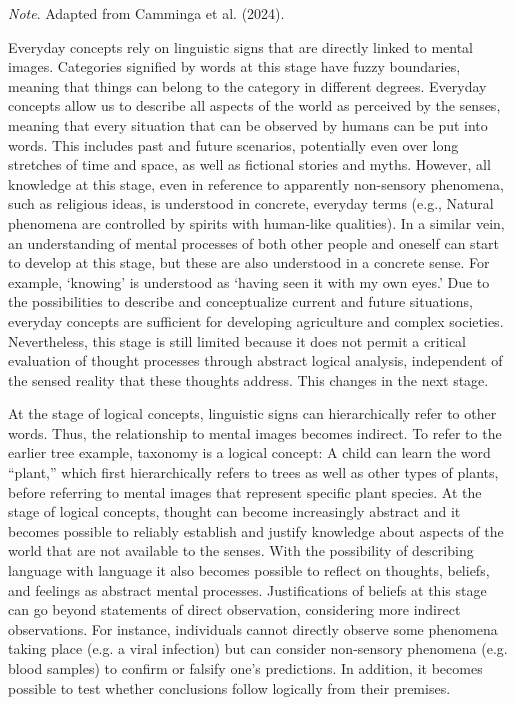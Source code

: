 \documentclass[authordate, empirical]{jote-new-article}
\begin{document}
	\emph{Note}. Adapted from Camminga et al. (2024).







	Everyday concepts rely on linguistic signs that are directly linked to mental images. Categories signified by words at this stage have fuzzy boundaries, meaning that things can belong to the category in different degrees. Everyday concepts allow us to describe all aspects of the world as perceived by the senses, meaning that every situation that can be observed by humans can be put into words. This includes past and future scenarios, potentially even over long stretches of time and space, as well as fictional stories and myths. However, all knowledge at this stage, even in reference to apparently non-sensory phenomena, such as religious ideas, is understood in concrete, everyday terms (e.g., Natural phenomena are controlled by spirits with human-like qualities). In a similar vein, an understanding of mental processes of both other people and oneself can start to develop at this stage, but these are also understood in a concrete sense. For example, ‘knowing' is understood as ‘having seen it with my own eyes.' Due to the possibilities to describe and conceptualize current and future situations, everyday concepts are sufficient for developing agriculture and complex societies. Nevertheless, this stage is still limited because it does not permit a critical evaluation of thought processes through abstract logical analysis, independent of the sensed reality that these thoughts address. This changes in the next stage.



	At the stage of logical concepts, linguistic signs can hierarchically refer to other words. Thus, the relationship to mental images becomes indirect. To refer to the earlier tree example, taxonomy is a logical concept: A child can learn the word “plant,” which first hierarchically refers to trees as well as other types of plants, before referring to mental images that represent specific plant species. At the stage of logical concepts, thought can become increasingly abstract and it becomes possible to reliably establish and justify knowledge about aspects of the world that are not available to the senses. With the possibility of describing language with language it also becomes possible to reflect on thoughts, beliefs, and feelings as abstract mental processes. Justifications of beliefs at this stage can go beyond statements of direct observation, considering more indirect observations. For instance, individuals cannot directly observe some phenomena taking place (e.g. a viral infection) but can consider non-sensory phenomena (e.g. blood samples) to confirm or falsify one's predictions. In addition, it becomes possible to test whether conclusions follow logically from their premises.
\end{document}

